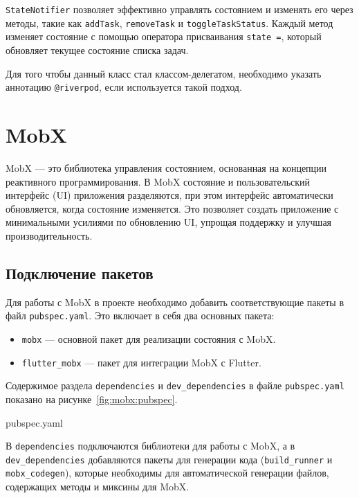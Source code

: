 \texttt{StateNotifier} позволяет эффективно управлять состоянием
и изменять его через методы, такие как \texttt{addTask}, \texttt{removeTask}
и \texttt{toggleTaskStatus}.
Каждый метод изменяет состояние
с помощью оператора присваивания \texttt{state =},
который обновляет текущее состояние списка задач.

Для того чтобы данный класс стал классом-делегатом,
необходимо указать аннотацию \texttt{@riverpod},
если используется такой подход.

\section{MobX}

MobX --- это библиотека управления состоянием,
основанная на концепции реактивного программирования.
В MobX состояние и пользовательский интерфейс (UI) приложения разделяются,
при этом интерфейс автоматически обновляется, когда состояние изменяется.
Это позволяет создать приложение с минимальными усилиями по обновлению UI,
упрощая поддержку и улучшая производительность.

\subsection{Подключение пакетов}

Для работы с MobX в проекте необходимо добавить соответствующие пакеты
в файл \texttt{pubspec.yaml}. Это включает в себя два основных пакета:

\begin{itemize}
    \item \texttt{mobx} --- основной пакет для реализации состояния с MobX.
    \item \texttt{flutter\_mobx} --- пакет для интеграции MobX с Flutter.
\end{itemize}

Содержимое раздела \texttt{dependencies}
и \texttt{dev\_dependencies} в файле \texttt{pubspec.yaml}
показано на рисунке~\ref{fig:mobx:pubspec}.

\begin{image}
	\caption{pubspec.yaml}
	\label{fig:mobx:pubspec}
\end{image}

В \texttt{dependencies} подключаются библиотеки для работы с MobX,
а в \texttt{dev\_dependencies} добавляются пакеты
для генерации кода (\texttt{build\_runner} и \texttt{mobx\_codegen}),
которые необходимы для автоматической генерации файлов,
содержащих методы и миксины для MobX.


